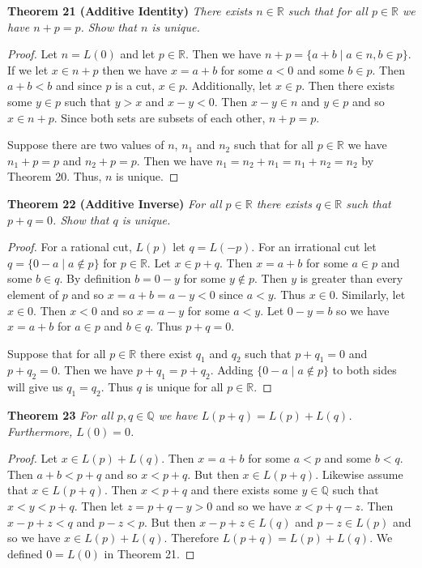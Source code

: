 \documentclass{article}
\begin{document}
\begin{flushleft}
\textbf{Theorem 21 (Additive Identity)}
\textsl{There exists $n \in \mathbb{R}$ such that for all $p \in \mathbb{R}$ we have $n+p=p$. Show that $n$ is unique.}
\begin{proof}
Let $n=L(0)$ and let $p \in \mathbb{R}$. Then we have $n+p=\{a+b \mid a \in n, b \in p\}$. If we let $x \in n+p$ then we have $x = a+b$ for some $a < 0$ and some $b \in p$. Then $a+b<b$ and since $p$ is a cut, $x \in p$. Additionally, let $x \in p$. Then there exists some $y \in p$ such that $y > x$ and $x-y < 0$. Then $x-y \in n$ and $y \in p$ and so $x \in n+p$. Since both sets are subsets of each other, $n+p=p$.\newline

Suppose there are two values of $n$, $n_1$ and $n_2$ such that for all $p \in \mathbb{R}$ we have $n_1+p=p$ and $n_2+p=p$. Then we have $n_1=n_2+n_1=n_1+n_2=n_2$ by Theorem 20. Thus, $n$ is unique.
\end{proof}

\textbf{Theorem 22 (Additive Inverse)}
\textsl{For all $p \in \mathbb{R}$ there exists $q \in \mathbb{R}$ such that $p+q=0$. Show that $q$ is unique.}
\begin{proof}
For a rational cut, $L(p)$ let $q = L(-p)$. For an irrational cut let $q=\{0-a \mid a \notin p\}$ for $p \in \mathbb{R}$. Let $x \in p+q$. Then $x=a+b$ for some $a \in p$ and some $b \in q$. By definition $b=0-y$ for some $y \notin p$. Then $y$ is greater than every element of $p$ and so $x=a+b=a-y<0$ since $a<y$. Thus $x \in 0$. Similarly, let $x \in 0$. Then $x<0$ and so $x=a-y$ for some $a<y$. Let $0-y=b$ so we have $x=a+b$ for $a \in p$ and $b \in q$. Thus $p+q=0$.\newline

Suppose that for all $p \in \mathbb{R}$ there exist $q_1$ and $q_2$ such that $p+q_1=0$ and $p+q_2=0$. Then we have $p+q_1=p+q_2$. Adding $\{0-a \mid a \notin p\}$ to both sides will give us $q_1=q_2$. Thus $q$ is unique for all $p \in \mathbb{R}$.
\end{proof}

\textbf{Theorem 23}
\textsl{For all $p,q \in \mathbb{Q}$ we have $L(p+q)=L(p)+L(q)$. Furthermore, $L(0)=0$.}
\begin{proof}
Let $x \in L(p)+L(q)$. Then $x=a+b$ for some $a < p$ and some $b < q$. Then $a+b < p+q$ and so $x<p+q$. But then $x \in L(p+q)$. Likewise assume that $x \in L(p+q)$. Then $x<p+q$ and there exists some $y \in \mathbb{Q}$ such that $x<y<p+q$. Then let $z = p+q-y>0$ and so we have $x<p+q-z$. Then $x-p+z<q$ and $p-z<p$. But then $x-p+z \in L(q)$ and $p-z \in L(p)$ and so we have $x \in L(p) + L(q)$. Therefore $L(p+q) = L(p) + L(q)$. We defined $0=L(0)$ in Theorem 21.
\end{proof}


\end{flushleft}
\end{document}
